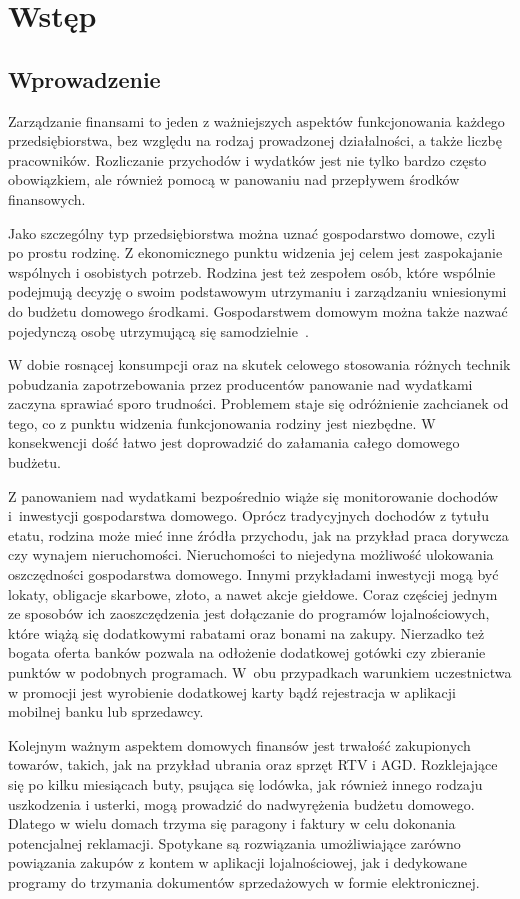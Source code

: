 \chapter{Wstęp}
\label{chap:wstep}
\section{Wprowadzenie}
\label{sec:wprowadzenie}
Zarządzanie finansami to jeden z ważniejszych aspektów funkcjonowania każdego przedsiębiorstwa, bez względu na rodzaj prowadzonej działalności, a także liczbę pracowników. Rozliczanie przychodów i wydatków jest nie tylko bardzo często obowiązkiem, ale również pomocą w panowaniu nad przepływem środków finansowych. 

Jako szczególny typ przedsiębiorstwa można uznać gospodarstwo domowe, czyli po prostu rodzinę. Z ekonomicznego punktu widzenia jej celem jest zaspokajanie wspólnych i osobistych potrzeb. Rodzina jest też zespołem osób, które wspólnie podejmują decyzję o swoim podstawowym utrzymaniu i zarządzaniu wniesionymi do budżetu domowego środkami. Gospodarstwem domowym można także nazwać pojedynczą osobę utrzymującą się samodzielnie~\cite{gospodarstwo-domowe}.

W dobie rosnącej konsumpcji oraz na skutek celowego stosowania różnych technik pobudzania zapotrzebowania przez producentów panowanie nad wydatkami zaczyna sprawiać sporo trudności. Problemem staje się odróżnienie zachcianek od tego, co z punktu widzenia funkcjonowania rodziny jest niezbędne. W konsekwencji dość łatwo jest doprowadzić do załamania całego domowego budżetu.

Z panowaniem nad wydatkami bezpośrednio wiąże się monitorowanie dochodów i~inwestycji gospodarstwa domowego. Oprócz tradycyjnych dochodów z tytułu etatu, rodzina może mieć inne źródła przychodu, jak na przykład praca dorywcza czy wynajem nieruchomości. Nieruchomości to niejedyna możliwość ulokowania oszczędności gospodarstwa domowego. Innymi przykładami inwestycji mogą być lokaty, obligacje skarbowe, złoto, a nawet akcje giełdowe. Coraz częściej jednym ze sposobów ich zaoszczędzenia jest dołączanie do programów lojalnościowych, które wiążą się dodatkowymi rabatami oraz bonami na zakupy. Nierzadko też bogata oferta banków pozwala na odłożenie dodatkowej gotówki czy zbieranie punktów w podobnych programach. W~obu przypadkach warunkiem uczestnictwa w promocji jest wyrobienie dodatkowej karty bądź rejestracja w aplikacji mobilnej banku lub sprzedawcy.

Kolejnym ważnym aspektem domowych finansów jest trwałość zakupionych towarów, takich, jak na przykład ubrania oraz sprzęt RTV i AGD. Rozklejające się po kilku miesiącach buty, psująca się lodówka, jak również innego rodzaju uszkodzenia i usterki, mogą prowadzić do nadwyrężenia budżetu domowego. Dlatego w wielu domach trzyma się paragony i faktury w celu dokonania potencjalnej reklamacji. Spotykane są rozwiązania umożliwiające zarówno powiązania zakupów z kontem w aplikacji lojalnościowej, jak i dedykowane programy do trzymania dokumentów sprzedażowych w formie elektronicznej.

